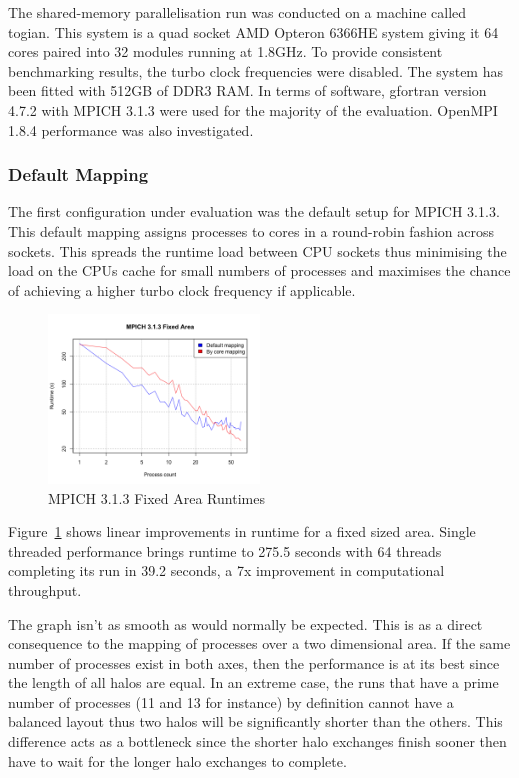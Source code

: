 The shared-memory parallelisation run was conducted on a machine called togian.
This system is a quad socket AMD Opteron 6366HE system giving it 64 cores paired
into 32 modules running at 1.8GHz. To provide consistent benchmarking results,
the turbo clock frequencies were disabled. The system has been fitted with 512GB
of DDR3 RAM. In terms of software, gfortran version 4.7.2 with MPICH 3.1.3 were
used for the majority of the evaluation. OpenMPI 1.8.4 performance was also
investigated.

\subsubsection{Default Mapping}

The first configuration under evaluation was the default setup for MPICH 3.1.3.
This default mapping assigns processes to cores in a round-robin fashion across
sockets. This spreads the runtime load between CPU sockets thus minimising the
load on the CPUs cache for small numbers of processes and maximises the chance
of achieving a higher turbo clock frequency if applicable.

\begin{figure}
    \includegraphics[width=0.5\textwidth]{graphs/MPICH313-fixed-area.png}
    \caption{MPICH 3.1.3 Fixed Area Runtimes}
    \label{fig:mpichdfixedarea}
\end{figure}

Figure~\ref{fig:mpichdfixedarea} shows linear improvements in runtime for a
fixed sized area. Single threaded performance brings runtime to 275.5 seconds
with 64 threads completing its run in 39.2 seconds, a 7x improvement in
computational throughput.

The graph isn't as smooth as would normally be expected. This is as a direct
consequence to the mapping of processes over a two dimensional area. If the same
number of processes exist in both axes, then the performance is at its best
since the length of all halos are equal. In an extreme case, the runs that have
a prime number of processes (11 and 13 for instance) by definition cannot have a
balanced layout thus two halos will be significantly shorter than the others.
This difference acts as a bottleneck since the shorter halo exchanges finish
sooner then have to wait for the longer halo exchanges to complete.

